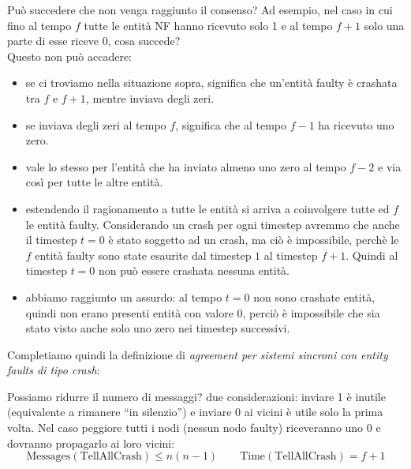 Può succedere che non venga raggiunto il consenso? Ad esempio, nel caso in cui fino al tempo $f$ tutte le entità NF hanno
ricevuto solo 1 e al tempo $f+1$ solo una parte di esse riceve 0, cosa succede?\\
Questo non può accadere:
\begin{itemize}
  \item se ci troviamo nella situazione sopra, significa che un'entità faulty è crashata tra $f$ e $f+1$, mentre inviava degli zeri.
  \item se inviava degli zeri al tempo $f$, significa che al tempo $f-1$ ha ricevuto uno zero.
  \item vale lo stesso per l'entità che ha inviato almeno uno zero al tempo $f-2$ e via così per tutte le altre entità.
  \item estendendo il ragionamento a tutte le entità si arriva a coinvolgere tutte ed $f$ le entità faulty.
  Considerando un crash per ogni timestep avremmo che anche il timestep $t=0$ è stato soggetto ad un crash, ma ciò è impossibile, perchè
  le $f$ entità faulty sono state esaurite dal timestep $1$ al timestep $f+1$. Quindi al timestep $t=0$ non può essere crashata nessuna entità.
  \item abbiamo raggiunto un assurdo: al tempo $t=0$ non sono crashate entità, quindi non erano presenti entità con valore 0, perciò
  è impossibile che sia stato visto anche solo uno zero nei timestep successivi.
\end{itemize}

Completiamo quindi la definizione di \textit{agreement per sistemi sincroni con entity faults di tipo crash}:

Possiamo ridurre il numero di messaggi? due considerazioni: inviare 1 è inutile (equivalente a rimanere ``in silenzio'') e
inviare 0 ai vicini è utile solo la prima volta. Nel caso peggiore tutti i nodi (nessun nodo faulty) riceveranno uno 0 e dovranno
propagarlo ai loro vicini:
$$
\text{Messages}(\text{TellAllCrash}) \leq n(n-1) \quad \quad \text{Time}(\text{TellAllCrash}) = f+1
$$

